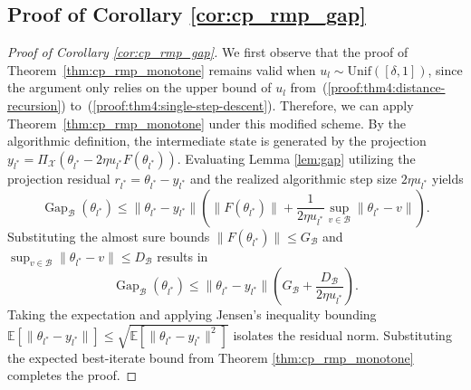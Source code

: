 \documentclass[letter,11pt]{article}
\begin{document}
\subsection{Proof of Corollary \ref{cor:cp_rmp_gap}}\label{sec:cp_rmp_gap}
\begin{proof}[Proof of Corollary \ref{cor:cp_rmp_gap}]
We first observe that the proof of Theorem~\ref{thm:cp_rmp_monotone} remains valid when $u_l\sim \mathrm{Unif}([\delta, 1])$, since the argument only relies on the upper bound of $u_l$ from~(\ref{proof:thm4:distance-recursion}) to~(\ref{proof:thm4:single-step-descent}). Therefore, we can apply Theorem~\ref{thm:cp_rmp_monotone} under this modified scheme. By the algorithmic definition, the intermediate state is generated by the projection $y_{l^*} = \Pi_{\mathcal{X}}(\theta_{l^*} - 2\eta u_{l^*} F(\theta_{l^*}))$. Evaluating Lemma \ref{lem:gap} utilizing the projection residual $r_{l^*} = \theta_{l^*} - y_{l^*}$ and the realized algorithmic step size $2\eta u_{l^*}$ yields
\begin{equation}
\operatorname{Gap}_{\mathcal{B}}(\theta_{l^*}) \le \|\theta_{l^*} - y_{l^*}\| \left( \|F(\theta_{l^*})\| + \frac{1}{2\eta u_{l^*}} \sup_{v \in \mathcal{B}} \|\theta_{l^*} - v\| \right).
\end{equation}
Substituting the almost sure bounds $\|F(\theta_{l^*})\| \le G_{\mathcal{B}}$ and $\sup_{v \in \mathcal{B}} \|\theta_{l^*} - v\| \le D_{\mathcal{B}}$ results in
\begin{equation}
\operatorname{Gap}_{\mathcal{B}}(\theta_{l^*}) \le \|\theta_{l^*} - y_{l^*}\| \left( G_{\mathcal{B}} + \frac{D_{\mathcal{B}}}{2\eta u_{l^*}} \right).
\end{equation}
Taking the expectation and applying Jensen's inequality bounding $\mathbb{E}[\|\theta_{l^*} - y_{l^*}\|] \le \sqrt{\mathbb{E}[\|\theta_{l^*} - y_{l^*}\|^2]}$ isolates the residual norm. Substituting the expected best-iterate bound from Theorem \ref{thm:cp_rmp_monotone} completes the proof.
\end{proof}
\end{document}
